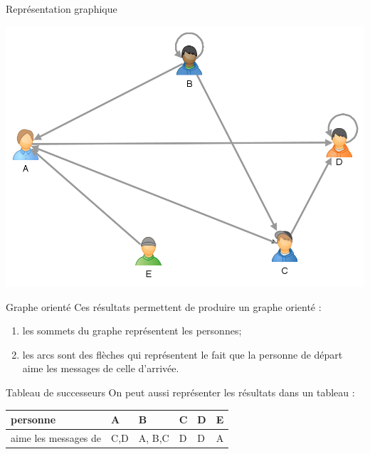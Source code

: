 \documentclass[10pt]{beamer}
\begin{document}
\begin{frame}{Représentation graphique}
\begin{center}
\includegraphics[width=\linewidth]{img/graphe1.png}
\end{center}
\end{frame}

\begin{frame}{Graphe orienté}
Ces résultats permettent de produire un \alert{graphe orienté} :\pause
\begin{enumerate}[--]
	\item 	les \alert{sommets du graphe} représentent les personnes;\pause
	\item 	les \alert{arcs} sont des flèches qui représentent le fait que la personne de départ aime les messages de celle d'arrivée.
\end{enumerate}
\end{frame}

\begin{frame}{Tableau de successeurs}
On peut aussi représenter les résultats dans un tableau :

\begin{center}
\begin{tabular}{|l|>{\centering\arraybackslash}p{.5cm}|>{\centering\arraybackslash}p{.5cm}|>{\centering\arraybackslash}p{.5cm}|>{\centering\arraybackslash}p{.5cm}|>{\centering\arraybackslash}p{.5cm}|}
\hline\rowcolor{beamerBlack}
\textbf{\color{beamerWhite}personne}& \textbf{\color{beamerWhite}A} & \textbf{\color{beamerWhite}B} &\textbf{\color{beamerWhite}C}& \textbf{\color{beamerWhite}D} & \textbf{\color{beamerWhite}E} \\
\hline
aime les messages de  & C,D & A, B,C & D & D & A \\
\hline
\end{tabular}
\end{center}
\end{frame}
\end{document}
